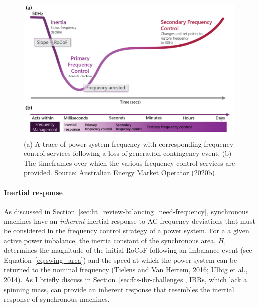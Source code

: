 \documentclass[12pt,a4paper,]{report}
\begin{document}
\begin{figure}
\hypertarget{fig:freq_control}{%
\centering
\includegraphics{source/figures/freq_control_timeframes.png}
\caption{(a) A trace of power system frequency with corresponding
frequency control services following a loss-of-generation contingency
event. (b) The timeframes over which the various frequency control
services are provided. Source: Australian Energy Market Operator
(\protect\hyperlink{ref-australianenergymarketoperatorPowerSystemRequirements2020}{2020b})}\label{fig:freq_control}
}
\end{figure}

\hypertarget{sec:lit_review-balancing_practices-inertial_response}{%
\paragraph{Inertial
response}\label{sec:lit_review-balancing_practices-inertial_response}}

As discussed in Section~\ref{sec:lit_review-balancing_need-frequency},
synchronous machines have an \emph{inherent} inertial response to AC
frequency deviations that must be considered in the frequency control
strategy of a power system. For a a given active power imbalance, the
inertia constant of the synchronous area, \(H\), determines the
magnitude of the initial RoCoF following an imbalance event (see
Equation~\ref{eq:swing_area}) and the speed at which the power system
can be returned to the nominal frequency
(\protect\hyperlink{ref-tielensRelevanceInertiaPower2016}{Tielens and
Van Hertem, 2016};
\protect\hyperlink{ref-ulbigImpactLowRotational2014}{Ulbig et al.,
2014}). As I briefly discuss in Section~\ref{sec:fcs-ibr-challenges},
IBRs, which lack a spinning mass, can provide an inherent response that
resembles the inertial response of synchronous machines.
\end{document}
